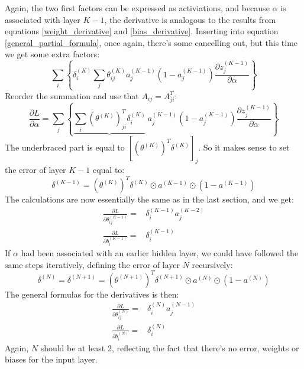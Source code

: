 \documentclass[12pt, a4paper]{article}
\numberwithin{equation}{section}
\begin{document}
Again, the two first factors can be expressed as activiations, and because $\alpha$ is associated with layer $K-1$, the derivative is analogous to the results from equations \ref{weight_derivative} and \ref{bias_derivative}. Inserting into equation \ref{general_partial_formula}, once again, there's some cancelling out, but this time we get some extra factors:
\begin{equation}
\sum_i\left\{\delta^{(K)}_i\sum_j\theta^{(K)}_{ij}a_j^{(K-1)}\left(1-a_j^{(K-1)}\right)\frac{\partial z^{(K-1)}_j}{\partial\alpha}\right\}
\end{equation}
Reorder the summation and use that $A_{ij}=A^T_{ji}$:
\begin{equation}
\frac{\partial L}{\partial\alpha}=\sum_{j}\left\{\underbrace{\sum_i\left(\theta^{(K)}\right)^T_{ji}\delta^{(K)}_i}\ a_j^{(K-1)}\left(1-a_j^{(K-1)}\right)\frac{\partial z^{(K-1)}_j}{\partial\alpha}\right\}
\end{equation}
The underbraced part is equal to $\left[\left(\theta^{(K)}\right)^T\delta^{(K)}\right]_j$. So it makes sense to set the error of layer $K-1$ equal to:
\begin{equation}
\label{backpropagating_errors}
\delta^{(K-1)}=\left(\theta^{(K)}\right)^T\delta^{(K)}\odot a^{(K-1)}\odot\left(1-a^{(K-1)}\right)
\end{equation}
The calculations are now essentially the same as in the last section, and we get:
\begin{align}
\frac{\partial L}{\partial\theta^{(K-1)}_{ij}}=&\delta^{(K-1)}_i a^{(K-2)}_j\\
\frac{\partial L}{\partial b^{(K-1)}_i}=&\delta^{(K-1)}_i
\end{align}
If $\alpha$ had been associated with an earlier hidden layer, we could have followed the same steps iteratively, defining the error of layer $N$ recursively:
\begin{equation}
\delta^{(N)}=\delta^{(N+1)}=\left(\theta^{(N+1)}\right)^T\delta^{(N+1)}\odot a^{(N)}\odot\left(1-a^{(N)}\right)
\end{equation}
The general formulas for the derivatives is then:
\begin{align}
\frac{\partial L}{\partial\theta^{(N)}_{ij}}=&\delta^{(N)}_i a^{(N-1)}_j\\
\frac{\partial L}{\partial b^{(N)}_i}=&\delta^{(N)}_i
\end{align}
Again, $N$ should be at least 2, reflecting the fact that there's no error, weights or biases for the input layer.
\end{document}
